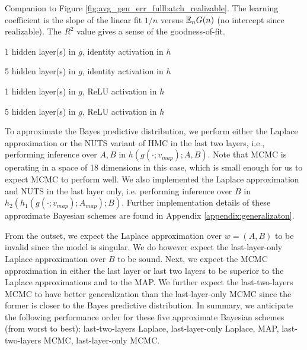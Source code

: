 \documentclass{article} %
\begin{document}
\begin{table}[h!]%
	\caption{Companion to Figure \ref{fig:avg_gen_err_fullbatch_realizable}. The learning coefficient is the slope of the linear fit $1/n$ versus $\mathbb{E}_n G(n)$ (no intercept since realizable). The $R^2$ value gives a sense of the goodness-of-fit.}
	\label{table:avg_gen_err_fullbatch_realizable}
	\centering
	\begin{tiny}
		\begin{subtable}[t]{2.5in}
			\caption{1 hidden layer(s) in $g$, identity activation in $h$}			
		\end{subtable}
		\quad
		\begin{subtable}[t]{2.5in}
			\caption{5 hidden layer(s) in $g$, identity activation in $h$}
			
		\end{subtable}
		\quad
		\begin{subtable}[t]{2.5in}
			\caption{1 hidden layer(s) in $g$, ReLU activation in $h$}
			
		\end{subtable}
		\quad
		\begin{subtable}[t]{2.5in}
			\caption{5 hidden layer(s) in $g$, ReLU activation in $h$}			
		\end{subtable}
	\end{tiny}
\end{table}

To approximate the Bayes predictive distribution, we perform either the Laplace approximation or the NUTS variant of HMC \citep{hoffman2014no} in the last two layers, i.e., performing inference over $A,B$ in
$h(g(\cdot;v_{map});A,B).$
Note that MCMC is operating in a space of 18 dimensions in this case, which is small enough for us to expect MCMC to perform well.
We also implemented the Laplace approximation and NUTS in the last layer only, i.e. performing inference over $B$ in
$h_2(h_1(g(\cdot;v_{map});A_{map}); B).$
Further implementation details of these approximate Bayesian schemes are found in Appendix \ref{appendix:generalizaton}.


From the outset, we expect the Laplace approximation over $w = (A, B)$ to be invalid since the model is singular. We do however expect the last-layer-only Laplace approximation over $B$ to be sound. Next, we expect the MCMC approximation in either the last layer or last two layers to be  superior to the Laplace approximations and to the MAP. We further expect the last-two-layers MCMC to have better generalization than the last-layer-only MCMC since the former is closer to the Bayes predictive distribution. In summary, we anticipate the following performance order for these five approximate Bayesian schemes (from worst to best): last-two-layers Laplace, last-layer-only Laplace, MAP, last-two-layers MCMC, last-layer-only MCMC.
\end{document}
